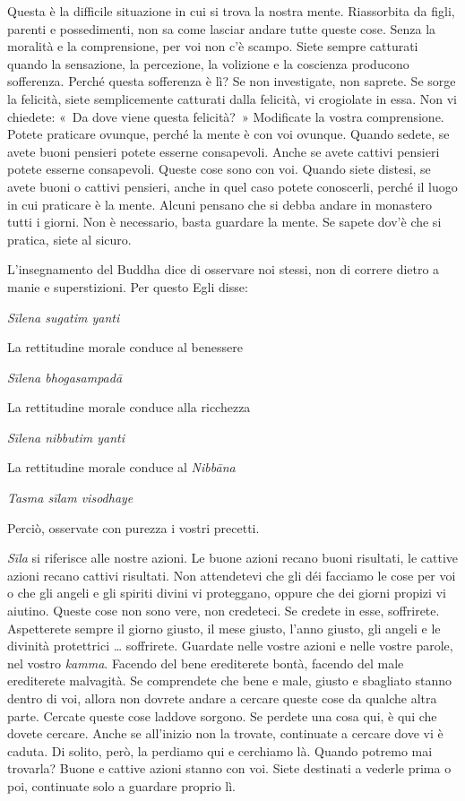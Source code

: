 Questa è la difficile situazione in cui si trova la nostra mente.
Riassorbita da figli, parenti e possedimenti, non sa come lasciar andare
tutte queste cose. Senza la moralità e la comprensione, per voi non c'è
scampo. Siete sempre catturati quando la sensazione, la percezione, la
volizione e la coscienza producono sofferenza. Perché questa sofferenza
è lì? Se non investigate, non saprete. Se sorge la felicità, siete
semplicemente catturati dalla felicità, vi crogiolate in essa. Non vi
chiedete: «~Da dove viene questa felicità?~» Modificate la vostra
comprensione. Potete praticare ovunque, perché la mente è con voi
ovunque. Quando sedete, se avete buoni pensieri potete esserne
consapevoli. Anche se avete cattivi pensieri potete esserne consapevoli.
Queste cose sono con voi. Quando siete distesi, se avete buoni o cattivi
pensieri, anche in quel caso potete conoscerli, perché il luogo in cui
praticare è la mente. Alcuni pensano che si debba andare in monastero
tutti i giorni. Non è necessario, basta guardare la mente. Se sapete
dov'è che si pratica, siete al sicuro.

L'insegnamento del Buddha dice di osservare noi stessi, non di correre
dietro a manie e superstizioni. Per questo Egli disse:

\emph{Sīlena sugatim yanti}

La rettitudine morale conduce al benessere

\emph{Sīlena bhogasampadā}

La rettitudine morale conduce alla ricchezza

\emph{Sīlena nibbutim yanti}

La rettitudine morale conduce al \emph{Nibbāna}

\emph{Tasma sīlam visodhaye}

Perciò, osservate con purezza i vostri precetti.

\emph{Sīla} si riferisce alle nostre azioni. Le buone azioni recano
buoni risultati, le cattive azioni recano cattivi risultati. Non
attendetevi che gli déi facciamo le cose per voi o che gli angeli e gli
spiriti divini vi proteggano, oppure che dei giorni propizi vi aiutino.
Queste cose non sono vere, non credeteci. Se credete in esse,
soffrirete. Aspetterete sempre il giorno giusto, il mese giusto, l'anno
giusto, gli angeli e le divinità protettrici \ldots{} soffrirete. Guardate
nelle vostre azioni e nelle vostre parole, nel vostro \emph{kamma}.
Facendo del bene erediterete bontà, facendo del male erediterete
malvagità. Se comprendete che bene e male, giusto e sbagliato stanno
dentro di voi, allora non dovrete andare a cercare queste cose da
qualche altra parte. Cercate queste cose laddove sorgono. Se perdete una
cosa qui, è qui che dovete cercare. Anche se all'inizio non la trovate,
continuate a cercare dove vi è caduta. Di solito, però, la perdiamo qui
e cerchiamo là. Quando potremo mai trovarla? Buone e cattive azioni
stanno con voi. Siete destinati a vederle prima o poi, continuate solo a
guardare proprio lì.

